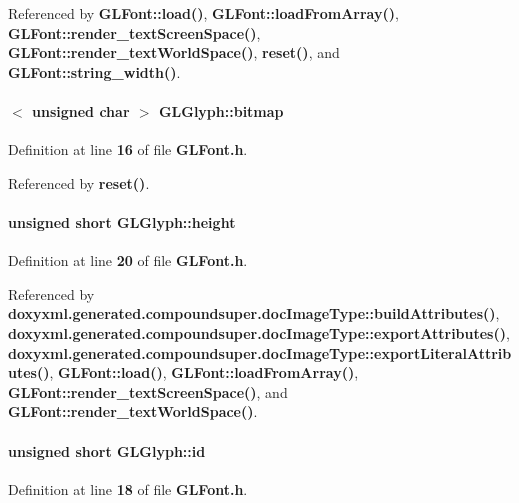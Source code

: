 Referenced by {\bf G\+L\+Font\+::load()}, {\bf G\+L\+Font\+::load\+From\+Array()}, {\bf G\+L\+Font\+::render\+\_\+text\+Screen\+Space()}, {\bf G\+L\+Font\+::render\+\_\+text\+World\+Space()}, {\bf reset()}, and {\bf G\+L\+Font\+::string\+\_\+width()}.

\paragraph[{bitmap}]{$<$ unsigned char $>$ G\+L\+Glyph\+::bitmap}\label{structGLGlyph_ab07d4c5d7b8153725c6ab802b2dbf06e}


Definition at line {\bf 16} of file {\bf G\+L\+Font.\+h}.



Referenced by {\bf reset()}.

\paragraph[{height}]{\setlength{\rightskip}{0pt plus 5cm}unsigned short G\+L\+Glyph\+::height}\label{structGLGlyph_a634bd86f0d996c64775fc95ecbe58915}


Definition at line {\bf 20} of file {\bf G\+L\+Font.\+h}.



Referenced by {\bf doxyxml.\+generated.\+compoundsuper.\+doc\+Image\+Type\+::build\+Attributes()}, {\bf doxyxml.\+generated.\+compoundsuper.\+doc\+Image\+Type\+::export\+Attributes()}, {\bf doxyxml.\+generated.\+compoundsuper.\+doc\+Image\+Type\+::export\+Literal\+Attributes()}, {\bf G\+L\+Font\+::load()}, {\bf G\+L\+Font\+::load\+From\+Array()}, {\bf G\+L\+Font\+::render\+\_\+text\+Screen\+Space()}, and {\bf G\+L\+Font\+::render\+\_\+text\+World\+Space()}.

\paragraph[{id}]{\setlength{\rightskip}{0pt plus 5cm}unsigned short G\+L\+Glyph\+::id}\label{structGLGlyph_af4328f5db2e98ba6fa3fbe93172d1cce}


Definition at line {\bf 18} of file {\bf G\+L\+Font.\+h}.



